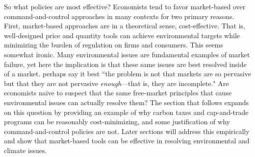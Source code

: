 
So what policies are most effective? Economists tend to favor market-based over command-and-control approaches in many contexts for two primary reasons. First, market-based approaches are in a theoretical sense, cost-effective. That is, well-designed price and quantity tools can achieve environmental targets while minimizing the burden of regulation on firms and consumers. This seems somewhat ironic. Many environmental issues are fundamental examples of market failure, yet here the implication is that these same issues are best resolved inside of a market. \cite{keohane2016markets} perhaps say it best ``the problem is not that markets are so pervasive but that they are not pervasive \emph{enough}---that is, they are incomplete." Are economists naive to suspect that the same free-market principles that cause environmental issues can actually resolve them? The section that follows expands on this question by providing an example of why carbon taxes and cap-and-trade programs can be reasonably cost-minimizing, and some justification of why command-and-control policies are not. Later sections will address this empirically and show that market-based tools can be effective in resolving environmental and climate issues.

